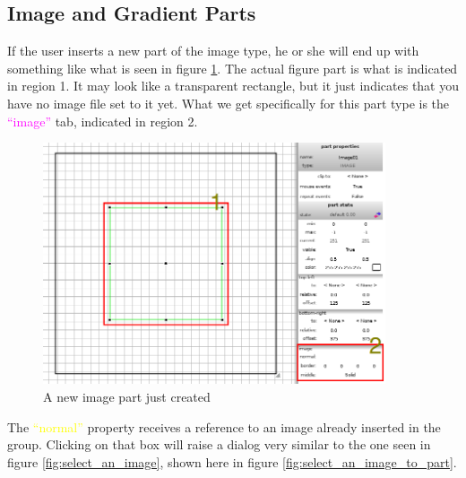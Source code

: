 \documentclass[a4paper]{profusion}
\newcommand{\GUIButton}[1]{\textcolor{green}{#1}} %
\newcommand{\GUILabel}[1]{\textcolor{magenta}{#1}}
\newcommand{\GUIEditable}[1]{\textcolor{yellow}{#1}} %
\begin{document}
\subsection{Image and Gradient Parts}

If the user inserts a new part of the image type, he or she will end
up with something like what is seen in figure \ref{fig:new_image}.
The actual figure part is what is indicated in region 1. It may look
like a transparent rectangle, but it just indicates that you have no
image file set to it yet. What we get specifically for this part type
is the \GUILabel{``image''} tab, indicated in region 2.

\begin{figure}[h!]
  \centering
  \includegraphics[width=0.9\textwidth]{images/new_image.png}
  \caption{A new image part just created}
  \label{fig:new_image}
\end{figure}

The \GUIEditable{``normal''} property receives a reference to an image
already inserted in the group. Clicking on that box will raise a
dialog very similar to the one seen in figure
\ref{fig:select_an_image}, shown here in figure
\ref{fig:select_an_image_to_part}.


\end{document}
